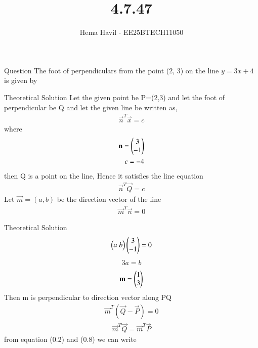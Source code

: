 \documentclass{beamer}
\title %
{4.7.47}
\author %
{Hema Havil - EE25BTECH11050}
\begin{document}
	
	\frame{\titlepage}
	\begin{frame}{Question}
		 The foot of perpendiculars from the point (2, 3) on the line $y = 3x + 4$ is given by
         \end{frame}
\begin{frame}{Theoretical Solution}
         Let the given point be P=(2,3) and let the foot of perpendicular be Q and let the given line be written as,
         \begin{align}
             \vec{n}^T\vec{x}=c
         \end{align}
         where\\
         \begin{align*}
             \mathbf{n} = \begin{pmatrix}3\\-1\end{pmatrix} \\ c=-4
         \end{align*}
         then Q is a point on the line, Hence it satisfies the line equation
         \begin{align}
             \vec{n}^T\vec{Q}=c
         \end{align}
         Let $\vec{m}=(a,b)$ be the direction vector of the line 
         \begin{align}
             \vec{m}^T\vec{n}=0
         \end{align}
         
\end{frame}
\begin{frame}{Theoretical Solution}
         \begin{align}
             \begin{pmatrix}a\;b\end{pmatrix}\begin{pmatrix}3\\-1\end{pmatrix}=0
         \end{align}
         \begin{align}
             3a=b
         \end{align}
         \begin{align}
             \mathbf{m}=\begin{pmatrix}1\\3\end{pmatrix}
         \end{align}
         Then m is perpendicular to direction vector along PQ\\
         \begin{align}
             \vec{m}^T(\vec{Q}-\vec{P})=0
         \end{align}
         \begin{align}
             \vec{m}^T\vec{Q}=\vec{m}^T\vec{P}
         \end{align}
         from equation (0.2) and (0.8) we can write 
\end{frame}
\end{document}
